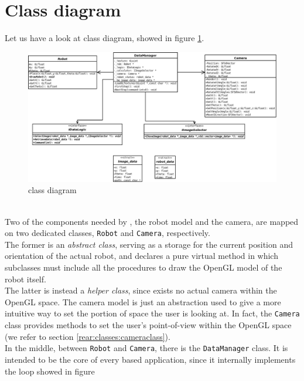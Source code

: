 \section{Class diagram}
\label{rear:classdiagram}

Let us have a look at \framework{} class diagram, 
showed in figure \ref{fig:class_diagram}.
\begin{figure}[!h]
  \begin{center}
    \includegraphics[width=\textheight, angle=90]{img/rear_class_diagram.png}
    \caption{\framework{} class diagram}
    \label{fig:class_diagram}
  \end{center}
\end{figure}
\\
Two of the components needed by \framework{}, the robot 
model and the camera, are mapped on two dedicated classes, 
\texttt{Robot} and \texttt{Camera}, respectively.
\\
The former is an \textit{abstract class}, serving as a storage 
for the current position and orientation of the actual
robot, and declares a pure virtual method in which subclasses 
must include all the procedures to draw the OpenGL model 
of the robot itself.
\\
The latter is instead a \textit{helper class}, since 
exists no actual camera within the OpenGL space. The camera 
model is just an abstraction used to give a more intuitive
way to set the portion of space the user is looking at.
In fact, the \texttt{Camera} class provides methods to 
set the user's point-of-view within the OpenGL space (we
refer to section \ref{rear:classes:cameraclass}).
\\
In the middle, between \texttt{Robot} and \texttt{Camera},
there is the \texttt{DataManager} class. It is intended to be 
the core of every \framework{} based application, since it 
internally implements the loop showed in figure 
